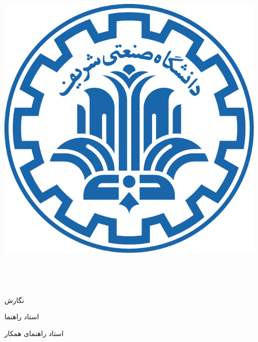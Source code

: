 

\begin{center}

\includegraphics[scale=0.25]{front/template/images/logo}

\vspace{-0.2cm}
\ThesisUniversity \\[-0.3em]
\ThesisDepartment

\begin{large}
\vspace{0.5cm}

\ThesisType \ \ThesisDegree \\[-0.3em]
\ThesisMajor

\end{large}

\vspace{2cm}

{\LARGE\textbf{\ThesisTitle}}

\vspace{2.5cm}

{نگارش}\\[.5em]
{\large\textbf{\ThesisAuthor}}

\vspace{0.7cm}

{استاد راهنما}\\[.5em]
{\large\textbf{\ThesisSupervisor}}

\vspace{0.7cm}

{استاد راهنمای همکار}\\[.5em]
{\large\textbf{\SecondSupervisor}}

\vspace{1.3cm}

\ThesisDate

\thispagestyle{empty} %
\end{center}

